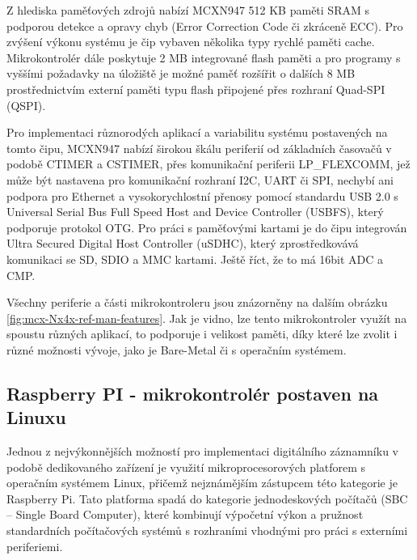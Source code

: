 Z hlediska paměťových zdrojů nabízí MCXN947 512 KB paměti SRAM s podporou detekce a opravy chyb (Error Correction Code či zkráceně ECC). Pro zvýšení výkonu systému je čip vybaven několika typy rychlé paměti cache. Mikrokontrolér dále poskytuje 2 MB integrované flash paměti a pro programy s vyššími požadavky na úložiště je možné paměť rozšířit o dalších 8 MB prostřednictvím externí paměti typu flash připojené přes rozhraní Quad-SPI (QSPI). \cite{nxp_MCX_Nx4x_Reference_Manual}

Pro implementaci různorodých aplikací a variabilitu systému postavených na tomto čipu, MCXN947 nabízí širokou škálu periferií od základních časovačů v podobě CTIMER a CSTIMER, přes komunikační periferii LP\_FLEXCOMM, jež může být nastavena pro komunikační rozhraní I2C, UART či SPI, nechybí ani podpora pro Ethernet a vysokorychlostní přenosy pomocí standardu USB 2.0 s Universal Serial Bus Full Speed Host and Device Controller (USBFS), který podporuje protokol OTG. Pro práci s paměťovými kartami je do čipu integrován Ultra Secured Digital Host Controller (uSDHC), který zprostředkovává komunikaci se SD, SDIO a MMC kartami. Ještě říct, že to má 16bit ADC a CMP. \cite{nxp_MCX_Nx4x_Reference_Manual}

Všechny periferie a části mikrokontroleru jsou znázorněny na dalším obrázku \ref{fig:mcx-Nx4x-ref-man-features}. Jak je vidno, lze tento mikrokontroler využít na spoustu různých aplikací, to podporuje i velikost paměti, díky které lze zvolit i různé možnosti vývoje, jako je Bare-Metal či s operačním systémem. 

%    

\subsection{Raspberry PI - mikrokontrolér postaven na Linuxu}
Jednou z nejvýkonnějších možností pro implementaci digitálního záznamníku v podobě dedikovaného zařízení je využití mikroprocesorových platforem s operačním systémem Linux, přičemž nejznámějším zástupcem této kategorie je Raspberry Pi. Tato platforma spadá do kategorie jednodeskových počítačů (SBC – Single Board Computer), které kombinují výpočetní výkon a pružnost standardních počítačových systémů s rozhraními vhodnými pro práci s externími periferiemi.

